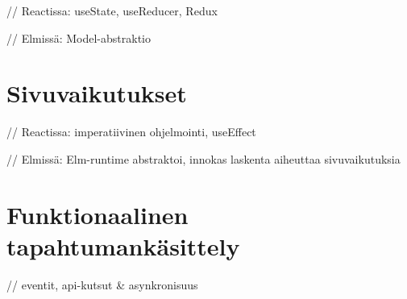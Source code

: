 // Reactissa: useState, useReducer, Redux

// Elmissä: Model-abstraktio

\section{Sivuvaikutukset}

// Reactissa: imperatiivinen ohjelmointi, useEffect

// Elmissä: Elm-runtime abstraktoi, innokas laskenta aiheuttaa sivuvaikutuksia

\section{Funktionaalinen tapahtumankäsittely}

// eventit, api-kutsut \& asynkronisuus
